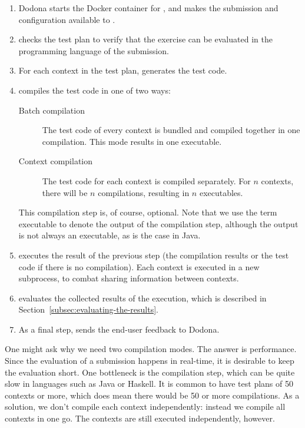 \documentclass[5p,number]{elsarticle}
\begin{document}
    \begin{enumerate}
        \item Dodona starts the Docker container for \tested{}, and makes the submission and configuration available to \tested{}.
        \item \tested{} checks the test plan to verify that the exercise can be evaluated in the programming language of the submission.
        \item For each context in the test plan, \tested{} generates the test code.
        \item \tested{} compiles the test code in one of two ways:
        \begin{description}
            \item[Batch compilation] The test code of every context is bundled and compiled together in one compilation.
            This mode results in one executable.
            \item[Context compilation] The test code for each context is compiled separately.
            For $n$ contexts, there will be $n$ compilations, resulting in $n$ executables.
        \end{description}
        This compilation step is, of course, optional.
        Note that we use the term executable to denote the output of the compilation step, although the output is not always an executable, as is the case in Java.
        \item \tested{} executes the result of the previous step (the compilation results or the test code if there is no compilation).
        Each context is executed in a new subprocess, to combat sharing information between contexts.
        \item \tested{} evaluates the collected results of the execution, which is described in Section~\ref{subsec:evaluating-the-results}.
        \item As a final step, \tested{} sends the end-user feedback to Dodona.
    \end{enumerate}
    
    One might ask why we need two compilation modes.
    The answer is performance.
    Since the evaluation of a submission happens in real-time, it is desirable to keep the evaluation short.
    One bottleneck is the compilation step, which can be quite slow in languages such as Java or Haskell.
    It is common to have test plans of 50 contexts or more, which does mean there would be 50 or more compilations.
    As a solution, we don't compile each context independently: instead we compile all contexts in one go.
    The contexts are still executed independently, however.
\end{document}
